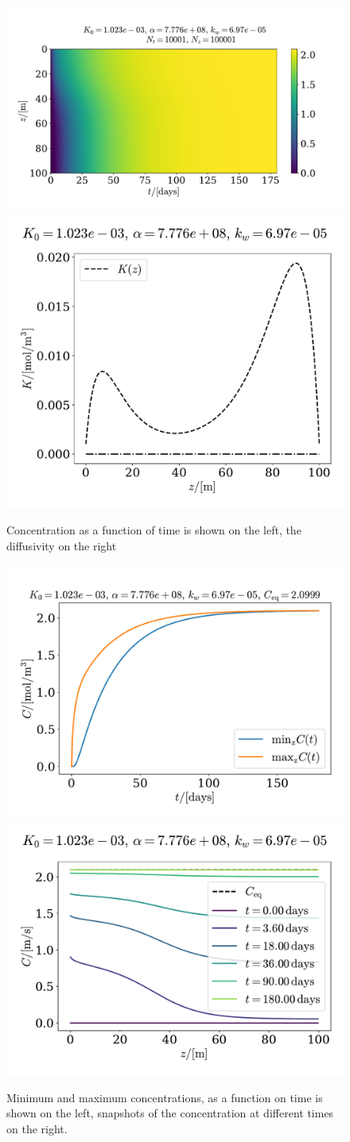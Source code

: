 \documentclass{article}
\begin{document}
    \begin{figure}[H]
        \centering
        \includegraphics[width=.6\textwidth]{../plots/prob2}
        \includegraphics[width=.39\textwidth]{../plots/prob2_K}
        \caption{Concentration as a function of time is shown on the left, the diffusivity on the right}
        \label{prob2}
    \end{figure}

    \begin{figure}[H]
        \centering
        \includegraphics[width=.49\textwidth]{../plots/prob2_minmax}
        \includegraphics[width=.49\textwidth]{../plots/prob2_i}
        \caption{Minimum and maximum concentrations, as a function on time is shown on the left, snapshots of the concentration at different times on the right.}
        \label{prob2 minmax}
    \end{figure}
\end{document}
